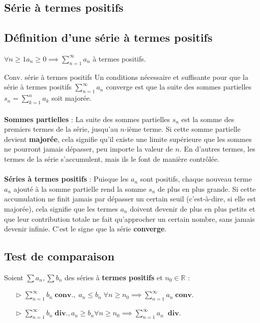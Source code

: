 \documentclass{report}
\begin{document}
\begin{multicols*}{3}
    \chapter{Série à termes positifs}

    \section{Définition d'une série à termes positifs}
    \noindent$\forall n \geq 1 a_n \geq 0 \implies \sum_{n=1}^{\infty }a_n$ à termes positifs.

    \begin{theorem}{Conv. série à termes positifs}{}
        Un conditions nécessaire et suffisante pour que la série à termes positifs 
        $\sum_{n=1}^{\infty }a_n$ converge est que la suite des sommes partielles
        $s_n = \sum_{k=1}^{n }a_k$ soit majorée. 
        \\\\ 

        \textbf{Sommes partielles} : La suite des sommes partielles \(s_n\) est la somme des 
        premiers termes de la série, jusqu'au \(n\)-ième terme. Si cette somme partielle 
        devient \textbf{majorée}, cela signifie qu'il existe une limite supérieure que les 
        sommes ne pourront jamais dépasser, peu importe la valeur de \(n\). En d'autres 
        termes, les termes de la série s'accumulent, mais ils le font de manière contrôlée.
        \\\\
        \textbf{Séries à termes positifs} : Puisque les \(a_n\) sont positifs, chaque nouveau 
        terme \(a_n\) ajouté à la somme partielle rend la somme \(s_n\) de plus en plus 
        grande. Si cette accumulation ne finit jamais par dépasser un certain seuil 
        (c'est-à-dire, si elle est majorée), cela signifie que les termes \(a_n\) doivent 
        devenir de plus en plus petits et que leur contribution totale ne fait qu'approcher 
        un certain nombre, sans jamais devenir infinie. C'est le signe que la série 
        \textbf{converge}.
    \end{theorem}
    \vspace{-2em}


     \section{Test de comparaison}
     Soient $\sum a_n, \sum b_n$ des séries à \textbf{termes positifs} 
     et $n_0 \in \mathbb{R}$ :
     \begin{itemize}
         \item[$\rhd$ ] $\sum_{n=1}^{\infty }b_n  \; \textbf{conv.}, \; 
                   a_n \leq b_n \; \forall n \geq n_0\implies 
                   \sum_{n=1}^{\infty }a_n \; \textbf{conv.}$ 
         \item[$\rhd$ ] $\sum_{n=1}^{\infty }b_n  \; \textbf{div.}, 
                   a_n \geq b_n \forall n \geq n_0 \implies 
                   \sum_{n=1}^{\infty }a_n \;\; \textbf{div.}$ 
     \end{itemize}


\end{multicols*}
\end{document}
